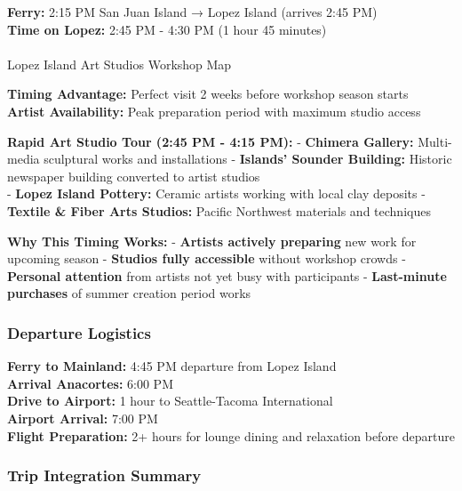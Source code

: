 \documentclass[
  11pt,
  letterpaper,
  DIV=10,
  numbers=noendperiod]{scrartcl}
\makeatletter
\let\oldparagraph\paragraph
\renewcommand{\paragraph}{
    \@ifstar
      \xxxParagraphStar
      \xxxParagraphNoStar
  }
\newcommand{\xxxParagraphStar}[1]{\oldparagraph*{#1}\mbox{}}
\newcommand{\xxxParagraphNoStar}[1]{\oldparagraph{#1}\mbox{}}
\makeatother
\begin{document}
\textbf{Ferry:} 2:15 PM San Juan Island → Lopez Island (arrives 2:45
PM)\\
\textbf{Time on Lopez:} 2:45 PM - 4:30 PM (1 hour 45 minutes)

\paragraph{Lopez Island Art Studios Workshop
Map}\label{lopez-island-art-studios-workshop-map}

\textbf{Timing Advantage:} Perfect visit 2 weeks before workshop season
starts\\
\textbf{Artist Availability:} Peak preparation period with maximum
studio access

\textbf{Rapid Art Studio Tour (2:45 PM - 4:15 PM):} - \textbf{Chimera
Gallery:} Multi-media sculptural works and installations -
\textbf{Islands' Sounder Building:} Historic newspaper building
converted to artist studios\\
- \textbf{Lopez Island Pottery:} Ceramic artists working with local clay
deposits - \textbf{Textile \& Fiber Arts Studios:} Pacific Northwest
materials and techniques

\textbf{Why This Timing Works:} - \textbf{Artists actively preparing}
new work for upcoming season - \textbf{Studios fully accessible} without
workshop crowds - \textbf{Personal attention} from artists not yet busy
with participants - \textbf{Last-minute purchases} of summer creation
period works

\subsubsection{Departure Logistics}\label{departure-logistics}

\textbf{Ferry to Mainland:} 4:45 PM departure from Lopez Island\\
\textbf{Arrival Anacortes:} 6:00 PM\\
\textbf{Drive to Airport:} 1 hour to Seattle-Tacoma International\\
\textbf{Airport Arrival:} 7:00 PM\\
\textbf{Flight Preparation:} 2+ hours for lounge dining and relaxation
before departure

\subsubsection{Trip Integration Summary}\label{trip-integration-summary}
\end{document}
